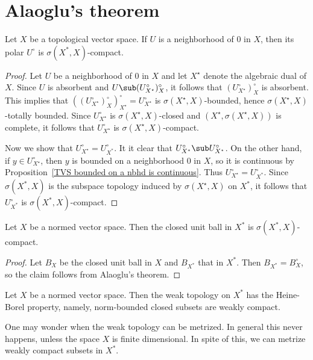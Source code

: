 \section{Alaoglu's theorem}
\begin{theorem}
Let $X$ be a topological vector space. If $U$ is a neighborhood of $0$ in $X$, then its polar $U^\circ$ is $\sigma(X^*,X)$-compact.
\end{theorem}
\begin{proof}
Let $U$ be a neighborhood of $0$ in $X$ and let $X^{\star}$ denote the algebraic dual of $X$. Since $U$ is absorbent and $U\sub(U^{\circ}_{X^{\star}})^{\circ}_X$, it follows that $(U^{\circ}_{X^{\star}})^{\circ}_X$ is absorbent. This implies that $((U^{\circ}_{X^{\star}})^{\circ}_X)^\circ_{X^{\star}}=U^{\circ}_{X^{\star}}$ is $\sigma(X^{\star},X)$-bounded, hence $\sigma(X^{\star},X)$-totally bounded. Since $U^{\circ}_{X^{\star}}$ is $\sigma(X^{\star},X)$-closed and $(X^{\star},\sigma(X^{\star},X))$ is complete, it follows that $U^{\circ}_{X^{\star}}$ is $\sigma(X^{\star},X)$-compact.\par
Now we show that $U^\circ_{X^{\star}}=U^\circ_{X^*}$. It it clear that $U^\circ_{X^*}\sub U^\circ_{X^{\star}}$. On the other hand, if $y\in U^{\circ}_{X^{\star}}$, then $y$ is bounded on a neighborhood $0$ in $X$, so it is continuous by Proposition~\ref{TVS bounded on a nbhd is continuous}.  Thus $U^\circ_{X^{\star}}=U^\circ_{X^*}$. Since $\sigma(X^*,X)$ is the subspace topology induced by $\sigma(X^{\star},X)$ on $X^*$, it follows that $U^\circ_{X^*}$ is $\sigma(X^*,X)$-compact.
\end{proof}
\begin{corollary}\label{NVS weak topo closed unit ball compact}
Let $X$ be a normed vector space. Then the closed unit ball in $X^*$ is $\sigma(X^*,X)$-compact.
\end{corollary}
\begin{proof}
Let $B_X$ be the closed unit ball in $X$ and $B_{X^*}$ that in $X^*$. Then $B_{X^*}=B_X^\circ$, so the claim follows from Alaoglu's theorem.
\end{proof}
\begin{corollary}\label{NVS weak topo HB prop}
Let $X$ be a normed vector space. Then the weak topology on $X^*$ has the Heine-Borel property, namely, norm-bounded closed subsets are weakly compact.
\end{corollary}
One may wonder when the weak topology can be metrized. In general this never happens, unless the space $X$ is finite dimensional. In spite of this, we can metrize weakly compact subsets in $X^*$.
